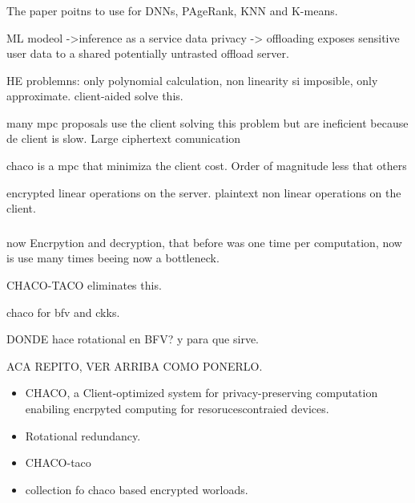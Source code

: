 \documentclass[10pt,handout]{beamer}
\begin{document}

\begin{frame}
\frametitle{}
The paper poitns to use for DNNs, PAgeRank, KNN and K-means.

ML modeol ->inference as a service
data privacy -> offloading exposes sensitive user data to a shared potentially untrasted offload server.

HE problemns: only polynomial calculation, non linearity si imposible, only approximate. client-aided solve this.

many mpc proposals use the client solving this problem but are ineficient because de client is slow.
    Large ciphertext comunication

    chaco is a mpc that minimiza the client cost. Order of magnitude less that others

    encrypted linear operations on the server.
    plaintext non linear operations on the client.


\end{frame}



\begin{frame}
\frametitle{}

now Encrpytion and decryption, that before was one time per  computation, now is use many times beeing now a bottleneck.

CHACO-TACO eliminates this.

chaco for bfv and ckks.

DONDE hace rotational en BFV? y para que sirve.

ACA REPITO, VER ARRIBA COMO PONERLO.
    \begin{itemize}
        \item CHACO, a Client-optimized system for privacy-preserving computation enabiling encrpyted computing for resorucescontraied devices.
        \item Rotational redundancy.
        \item CHACO-taco
        \item collection fo chaco based encrypted worloads.
    \end{itemize}

\end{frame}
\end{document}
